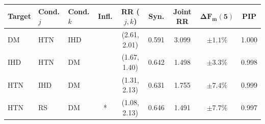 \begin{tabular}{lllcccccc}
\toprule
\textbf{Target} & \textbf{Cond. $j$} & \textbf{Cond. $k$} & \textbf{Infl.} & \textbf{RR ($j,k$)} & \textbf{Syn.} & \textbf{Joint RR} & $\boldsymbol{\Delta F_m(5)}$ & $\mathbf{PIP}$ \\
\midrule
DM  & HTN & IHD &  & (2.61, 2.01) & 0.591 & 3.099 & $\pm 1.1\%$ & 1.000 \\
IHD & HTN & DM  &  & (1.67, 1.40) & 0.642 & 1.498 & $\pm 3.3\%$ & 0.998 \\
HTN & IHD & DM  &  & (1.31, 2.13) & 0.631 & 1.755 & $\pm 7.4\%$ & 0.999 \\
HTN & RS  & DM  & * & (1.08, 2.13) & 0.646 & 1.491 & $\pm 7.7\%$ & 0.997 \\
\bottomrule
\end{tabular}
